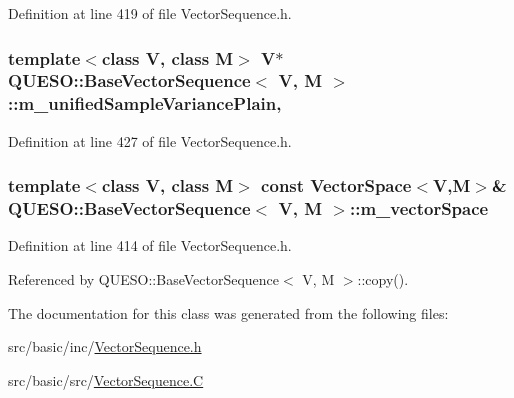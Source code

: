Definition at line 419 of file Vector\-Sequence.\-h.

\hypertarget{class_q_u_e_s_o_1_1_base_vector_sequence_ab6fa4daa233c386ea96718cf6cac603b}{
\subsubsection[{m\-\_\-unified\-Sample\-Variance\-Plain}]{\setlength{\rightskip}{0pt plus 5cm}template$<$class V, class M$>$ V$\ast$ {\bf Q\-U\-E\-S\-O\-::\-Base\-Vector\-Sequence}$<$ V, M $>$\-::m\-\_\-unified\-Sample\-Variance\-Plain\hspace{0.3cm}{\ttfamily [mutable]}, {\ttfamily [protected]}}}\label{class_q_u_e_s_o_1_1_base_vector_sequence_ab6fa4daa233c386ea96718cf6cac603b}


Definition at line 427 of file Vector\-Sequence.\-h.

\hypertarget{class_q_u_e_s_o_1_1_base_vector_sequence_a4bd171e39ed050ff105c808336f35198}{
\subsubsection[{m\-\_\-vector\-Space}]{\setlength{\rightskip}{0pt plus 5cm}template$<$class V, class M$>$ const {\bf Vector\-Space}$<$V,M$>$\& {\bf Q\-U\-E\-S\-O\-::\-Base\-Vector\-Sequence}$<$ V, M $>$\-::m\-\_\-vector\-Space\hspace{0.3cm}{\ttfamily [protected]}}}\label{class_q_u_e_s_o_1_1_base_vector_sequence_a4bd171e39ed050ff105c808336f35198}


Definition at line 414 of file Vector\-Sequence.\-h.



Referenced by Q\-U\-E\-S\-O\-::\-Base\-Vector\-Sequence$<$ V, M $>$\-::copy().



The documentation for this class was generated from the following files\-:\begin{DoxyCompactItemize}
\item 
src/basic/inc/\hyperlink{_vector_sequence_8h}{Vector\-Sequence.\-h}\item 
src/basic/src/\hyperlink{_vector_sequence_8_c}{Vector\-Sequence.\-C}\end{DoxyCompactItemize}
